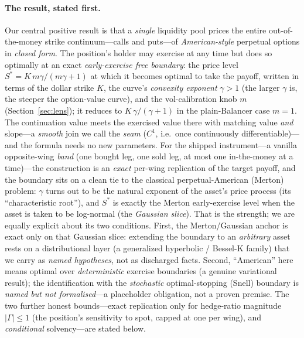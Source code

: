 \documentclass[11pt]{article}
\begin{document}
\paragraph{The result, stated first.}
Our central positive result is that a \emph{single} liquidity pool prices the
entire out-of-the-money strike continuum---calls and puts---of
\emph{American-style} perpetual options in \emph{closed form}. The position's
holder may exercise at any time but does so optimally at an exact
\emph{early-exercise free boundary}: the price level
$S^{\ast}=K\,m\gamma/(m\gamma+1)$ at which it becomes optimal to take the payoff,
written in terms of the dollar strike $K$, the curve's \emph{convexity exponent}
$\gamma>1$ (the larger $\gamma$ is, the steeper the option-value curve), and the
vol-calibration knob $m$ (Section~\ref{sec:lens}); it reduces to
$K\,\gamma/(\gamma+1)$ in the plain-Balancer case $m=1$. The continuation value meets the exercised value there
with matching value \emph{and} slope---a \emph{smooth} join we call the
\emph{seam} ($C^{1}$, i.e.\ once continuously differentiable)---and the formula
needs no new parameters. For the shipped instrument---a vanilla opposite-wing
\emph{band} (one bought leg, one sold leg, at most one in-the-money at a time)---the
construction is an \emph{exact} per-wing replication of the target payoff, and the
boundary sits on a clean tie to the classical perpetual-American (Merton) problem:
$\gamma$ turns out to be the natural exponent of the asset's price process (its
``characteristic root''), and $S^{\ast}$ is exactly the Merton early-exercise level
when the asset is taken to be log-normal (the \emph{Gaussian slice}). That is the
strength; we are equally explicit about its two conditions. First, the
Merton/Gaussian anchor is exact only on that Gaussian slice: extending the boundary
to an \emph{arbitrary} asset rests on a distributional layer (a generalized
hyperbolic / Bessel-K family) that we carry as \emph{named hypotheses}, not as
discharged facts. Second, ``American'' here means optimal over \emph{deterministic}
exercise boundaries (a genuine variational result); the identification with the
\emph{stochastic} optimal-stopping (Snell) boundary is \emph{named but not
formalised}---a placeholder obligation, not a proven premise. The two further
honest bounds---exact replication only for hedge-ratio magnitude $|\Gamma|\le1$
(the position's sensitivity to spot, capped at one per wing), and
\emph{conditional} solvency---are stated below.
\end{document}
